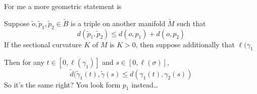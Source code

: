 \begin{remark}
For me a more geometric statement is



Suppose $\tilde{o}, \tilde{p}_1,\tilde{p}_2 \in \tilde{B}$ is a triple on 
another manifold $\tilde{M}$ such that 
$$
d(\tilde{p}_1,\tilde{p}_2) \leq  d(o,p_1)+d(o,p_2)
$$
If the sectional curvature $K$ of $M$ is $K>0$, then suppose additionally that
$\ell(\gamma_1$

Then for any $t \in [0,\ell(\gamma_1)]$ and $s \in [0,\ell(\sigma)]$,
$$
\tilde{d}(\tilde{\gamma}_1(t),\tilde{\gamma}(s)\leq d(\gamma_1(t),\gamma_2(s))
$$
So it's the same right? You look form $p_1$ instead…
\end{remark}
















\clearpage





